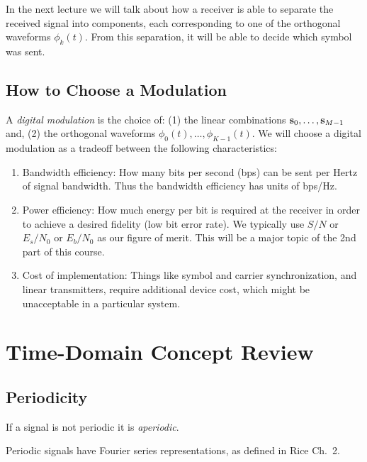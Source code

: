 In the next lecture we will talk about how a receiver is able to separate the received signal into components, each corresponding to one of the orthogonal waveforms $\phi_k(t)$.  From this separation, it will be able to decide which symbol was sent.


\subsection{How to Choose a Modulation}

A \textit{digital modulation} is the choice of: (1) the  linear combinations $\mathbf{s}_0, \ldots, \mathbf{s}_{M-1}$ and, (2) the orthogonal waveforms $\phi_0(t), \ldots, \phi_{K-1}(t)$.  We will choose a digital modulation as a tradeoff between the following characteristics:
\begin{enumerate}
 \item Bandwidth efficiency: How many bits per second (bps) can be sent per Hertz of signal bandwidth.  Thus the bandwidth efficiency has units of bps/Hz.
 \item Power efficiency: How much energy per bit is required at the receiver in order to achieve a desired fidelity (low bit error rate).  We typically use $S/N$ or $E_s/N_0$ or $E_b/N_0$ as our figure of merit.  This will be a major topic of the 2nd part of this course.
 \item Cost of implementation:  Things like symbol and carrier synchronization, and linear transmitters, require additional device cost, which might be unacceptable in a particular system.
\end{enumerate}




\section{Time-Domain Concept Review}

\subsection{Periodicity}


If a signal is not periodic it is {\it aperiodic}.

Periodic signals have Fourier series representations, as defined in Rice Ch.~2.


